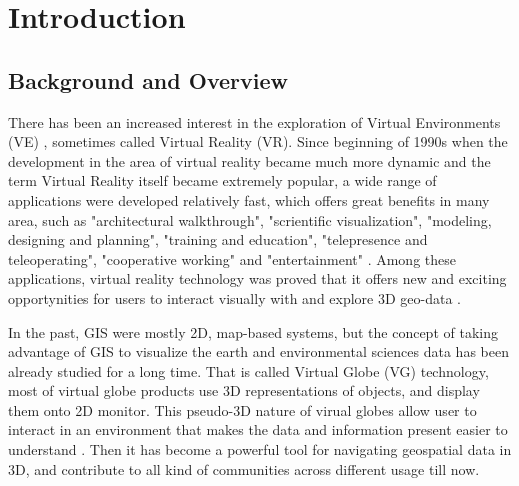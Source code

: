 \label{chapter-introduction}
\chapter{Introduction}

\section{Background and Overview}

There has been an increased interest in the exploration of Virtual Environments (VE) \parencite{huang.java-cgi-vr.2002}, sometimes called Virtual Reality (VR). Since beginning of 1990s when the development in the area of virtual reality became much more dynamic and the term Virtual Reality itself became extremely popular, a wide range of applications were developed relatively fast, which offers great benefits in many area, such as "architectural walkthrough", "scrientific visualization", "modeling, designing and planning", "training and education", "telepresence and teleoperating", "cooperative working" and "entertainment" \parencite{mazuryk.vr.1996}. Among these applications, virtual reality technology was proved that it offers new and exciting opportynities for users to interact visually with and explore 3D geo-data \parencite{huang.java-cgi-vr.2002}.

In the past, GIS were mostly 2D, map-based systems, but the concept of taking advantage of GIS to visualize the earth and environmental sciences data has been already studied for a long time. That is called Virtual Globe (VG) technology, most of virtual globe products use 3D representations of objects, and display them onto 2D monitor. This pseudo-3D nature of virual globes allow user to interact in an environment that makes the data and information present easier to understand \parencite{tuttle.virtual-globes.2008}. Then it has become a powerful tool for navigating geospatial data in 3D, and contribute to all kind of communities across different usage till now. 

